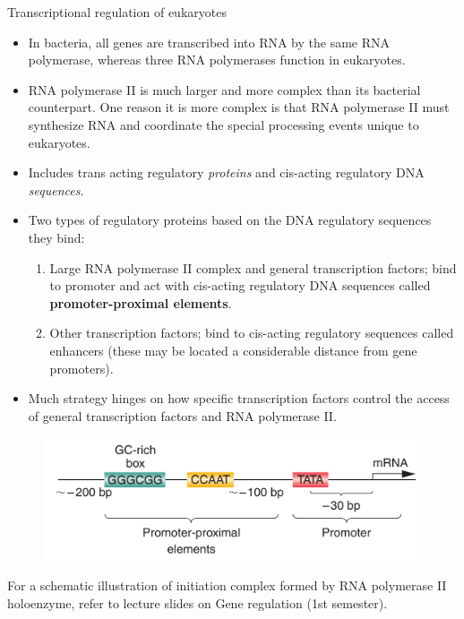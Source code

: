 \documentclass[11pt,dvipsnames,ignorenonframetext,aspectratio=169]{beamer}
\providecommand{\tightlist}{%
  \setlength{\itemsep}{0pt}\setlength{\parskip}{0pt}}
\begin{document}
\begin{frame}{Transcriptional regulation of eukaryotes}
\protect\hypertarget{transcriptional-regulation-of-eukaryotes}{}
\begin{itemize}
\tightlist
\item
  In bacteria, all genes are transcribed into RNA by the same RNA
  polymerase, whereas three RNA polymerases function in eukaryotes.
\item
  RNA polymerase II is much larger and more complex than its bacterial
  counterpart. One reason it is more complex is that RNA polymerase II
  must synthesize RNA and coordinate the special processing events
  unique to eukaryotes.
\item
  Includes trans acting regulatory \emph{proteins} and cis-acting
  regulatory DNA \emph{sequences}.
\item
  Two types of regulatory proteins based on the DNA regulatory sequences
  they bind:

  \begin{enumerate}
  \tightlist
  \item
    Large RNA polymerase II complex and general transcription factors;
    bind to promoter and act with cis-acting regulatory DNA sequences
    called \textbf{promoter-proximal elements}.
  \item
    Other transcription factors; bind to cis-acting regulatory sequences
    called enhancers (these may be located a considerable distance from
    gene promoters).
  \end{enumerate}
\item
  Much strategy hinges on how specific transcription factors control the
  access of general transcription factors and RNA polymerase II.
\end{itemize}
\end{frame}

\begin{frame}{}
\protect\hypertarget{section-12}{}
\begin{figure}
\includegraphics[width=0.65\linewidth]{../images/promoter_promoter_proximal_elements} \end{figure}

For a schematic illustration of initiation complex formed by RNA
polymerase II holoenzyme, refer to lecture slides on Gene regulation
(1st semester).
\end{frame}
\end{document}
